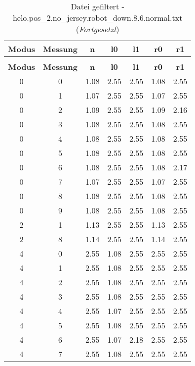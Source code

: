 \clearpage{}
\begin{longtable}{|c|c||c||c|c||c|c|}
	\caption{Datei gefiltert - helo.pos\_2.no\_jersey.robot\_down.8.6.normal.txt} \label{tab:helo.pos-2.no-jersey.robot-down.8.6.normal.txt} \\ \hline
	\textbf{Modus} & \textbf{Messung} & \textbf{n} & \textbf{l0} & \textbf{l1} & \textbf{r0} & \textbf{r1}\\ \hline
	\endfirsthead
	\caption[]{Datei gefiltert - helo.pos\_2.no\_jersey.robot\_down.8.6.normal.txt (\emph{Fortgesetzt})} \\ \hline
	\textbf{Modus} & \textbf{Messung} & \textbf{n} & \textbf{l0} & \textbf{l1} & \textbf{r0} & \textbf{r1}\\ \hline
	\endhead
	0 & 0 & 1.08 & 2.55 & 2.55 & 1.08 & 2.55 \\ \hline
	0 & 1 & 1.07 & 2.55 & 2.55 & 1.07 & 2.55 \\ \hline
	0 & 2 & 1.09 & 2.55 & 2.55 & 1.09 & 2.16 \\ \hline
	0 & 3 & 1.08 & 2.55 & 2.55 & 1.08 & 2.55 \\ \hline
	0 & 4 & 1.08 & 2.55 & 2.55 & 1.08 & 2.55 \\ \hline
	0 & 5 & 1.08 & 2.55 & 2.55 & 1.08 & 2.55 \\ \hline
	0 & 6 & 1.08 & 2.55 & 2.55 & 1.08 & 2.17 \\ \hline
	0 & 7 & 1.07 & 2.55 & 2.55 & 1.07 & 2.55 \\ \hline
	0 & 8 & 1.08 & 2.55 & 2.55 & 1.08 & 2.55 \\ \hline
	0 & 9 & 1.08 & 2.55 & 2.55 & 1.08 & 2.55 \\ \hline
	2 & 1 & 1.13 & 2.55 & 2.55 & 1.13 & 2.55 \\ \hline
	2 & 8 & 1.14 & 2.55 & 2.55 & 1.14 & 2.55 \\ \hline
	4 & 0 & 2.55 & 1.08 & 2.55 & 2.55 & 2.55 \\ \hline
	4 & 1 & 2.55 & 1.08 & 2.55 & 2.55 & 2.55 \\ \hline
	4 & 2 & 2.55 & 1.08 & 2.55 & 2.55 & 2.55 \\ \hline
	4 & 3 & 2.55 & 1.08 & 2.55 & 2.55 & 2.55 \\ \hline
	4 & 4 & 2.55 & 1.07 & 2.55 & 2.55 & 2.55 \\ \hline
	4 & 5 & 2.55 & 1.08 & 2.55 & 2.55 & 2.55 \\ \hline
	4 & 6 & 2.55 & 1.07 & 2.18 & 2.55 & 2.55 \\ \hline
	4 & 7 & 2.55 & 1.08 & 2.55 & 2.55 & 2.55 \\ \hline

\end{longtable}
